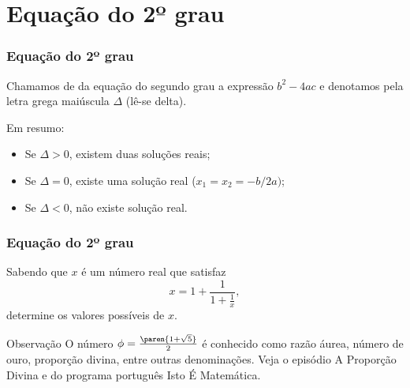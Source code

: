 \section{Equação do 2º grau}
\begin{frame}
    \frametitle{Equação do 2º grau} 
    
    \begin{definicao}
    Chamamos de  da equação do segundo grau a
    expressão $b^2-4ac$ e denotamos pela letra grega maiúscula $\Delta$
    (lê-se delta).
    \end{definicao}
    
    Em resumo:
    \begin{itemize}
        \item Se $\Delta > 0$, existem duas soluções reais;
        \item Se $\Delta = 0 $, existe uma solução real ($x_1 = x_2 =
        -b/2a)$;
        \item Se $\Delta < 0$, não existe solução real.
    \end{itemize}
    
    \end{frame}
    
    
    
    
    \begin{frame}
    \frametitle{Equação do 2º grau} 
    
    \begin{exemplo}
    Sabendo que $x$ é um número real que satisfaz $$x = 1 + \frac 1 {1 +
    \frac 1 x},$$ determine os valores possíveis de $x$.
    \end{exemplo}
    \pause
    \begin{block}{Observação}
    O número $\phi = \frac{\paren {1+\sqrt 5}}2$ é conhecido como razão
    áurea, número de ouro, proporção divina, entre outras denominações.
    Veja o episódio A Proporção Divina
     e
     do
    programa português Isto É Matemática.
    \end{block}
    
    \end{frame}
    
